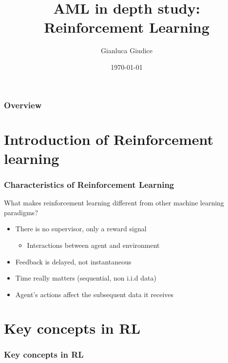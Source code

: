 \documentclass[9pt]{beamer}
\title{AML in depth study: Reinforcement Learning}
\author{
 Gianluca Giudice
}
\institute[UNIMIB] %
{
University of Milano-Bicocca\\
\medskip
\textit{g.giudice2@campus.unimib.it}
}
\date{\today} %
\begin{document}
\begin{frame}
\titlepage %
\end{frame}

\begin{frame}
\frametitle{Overview} %
\tableofcontents %
\end{frame}

\section{Introduction of Reinforcement learning}

\begin{frame}
\frametitle{Characteristics of Reinforcement Learning}

What makes reinforcement learning different from other machine learning paradigms?
\begin{itemize}
\item There is no supervisor, only a reward signal
\begin{itemize}
	\item Interactions between agent and environment
\end{itemize}
\item Feedback is delayed, not instantaneous
\item Time really matters (sequential, non i.i.d data)
\item Agent's actions affect the subsequent data it receives
\end{itemize}

\end{frame}

\section{Key concepts in RL}

\begin{frame}
\frametitle{Key concepts in RL}

\tableofcontents[ 
currentsubsection, 
hideothersubsections, 
sectionstyle=show/shaded,
]

\end{frame}
\end{document}
